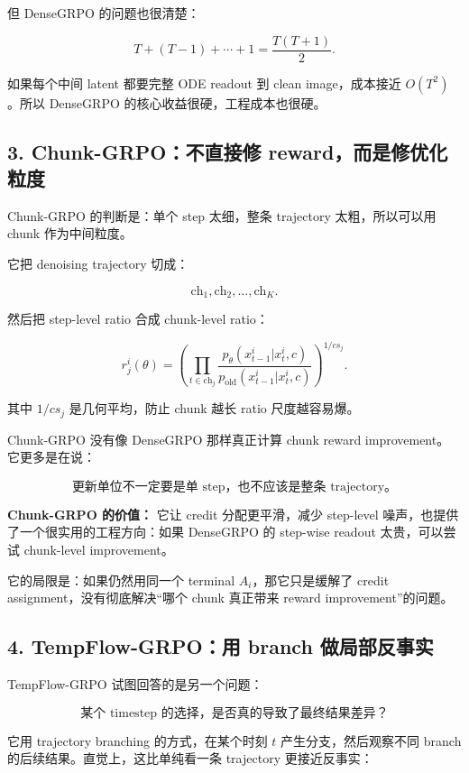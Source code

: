 但 DenseGRPO 的问题也很清楚：

\[
T+(T-1)+\cdots+1
=
\frac{T(T+1)}{2}.
\]

如果每个中间 latent 都要完整 ODE readout 到 clean image，成本接近 \(O(T^2)\)。所以 DenseGRPO 的核心收益很硬，工程成本也很硬。

\subsection{3. Chunk-GRPO：不直接修 reward，而是修优化粒度}

Chunk-GRPO 的判断是：单个 step 太细，整条 trajectory 太粗，所以可以用 chunk 作为中间粒度。

它把 denoising trajectory 切成：

\[
\mathrm{ch}_1,\mathrm{ch}_2,\ldots,\mathrm{ch}_K.
\]

然后把 step-level ratio 合成 chunk-level ratio：

\[
r_j^i(\theta)
=
\left(
\prod_{t\in \mathrm{ch}_j}
\frac{
p_\theta(x_{t-1}^i|x_t^i,c)
}{
p_{\mathrm{old}}(x_{t-1}^i|x_t^i,c)
}
\right)^{1/cs_j}.
\]

其中 \(1/cs_j\) 是几何平均，防止 chunk 越长 ratio 尺度越容易爆。

Chunk-GRPO 没有像 DenseGRPO 那样真正计算 chunk reward improvement。它更多是在说：

\[
\text{更新单位不一定要是单 step，也不应该是整条 trajectory。}
\]

\begin{summarybox}
\textbf{Chunk-GRPO 的价值：} 它让 credit 分配更平滑，减少 step-level 噪声，也提供了一个很实用的工程方向：如果 DenseGRPO 的 step-wise readout 太贵，可以尝试 chunk-level improvement。
\end{summarybox}

它的局限是：如果仍然用同一个 terminal \(A_i\)，那它只是缓解了 credit assignment，没有彻底解决“哪个 chunk 真正带来 reward improvement”的问题。

\subsection{4. TempFlow-GRPO：用 branch 做局部反事实}

TempFlow-GRPO 试图回答的是另一个问题：

\[
\text{某个 timestep 的选择，是否真的导致了最终结果差异？}
\]

它用 trajectory branching 的方式，在某个时刻 \(t\) 产生分支，然后观察不同 branch 的后续结果。直觉上，这比单纯看一条 trajectory 更接近反事实：

